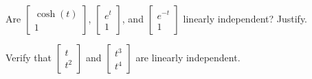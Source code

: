 \documentclass{ximera}
\begin{document}
\begin{exercise}%
    Are
    $\left[ 
        \begin{smallmatrix}
            \cosh(t) \\ 
            1
        \end{smallmatrix}
    \right]$,
    $\left[ 
        \begin{smallmatrix}
            e^{t} \\ 
            1
        \end{smallmatrix}
    \right]$,
    and
    $\left[ 
        \begin{smallmatrix}
            e^{-t} \\ 
            1
        \end{smallmatrix}
    \right]$
    linearly independent?  Justify.
\end{exercise}

\begin{exercise}
    Verify that
    $\left[ 
        \begin{smallmatrix}
            t \\ 
            t^2
        \end{smallmatrix} 
    \right]$ and
    $\left[ 
        \begin{smallmatrix}
            t^3 \\ 
            t^4
        \end{smallmatrix} 
    \right]$ 
    are linearly independent.
\end{exercise}
\end{document}
